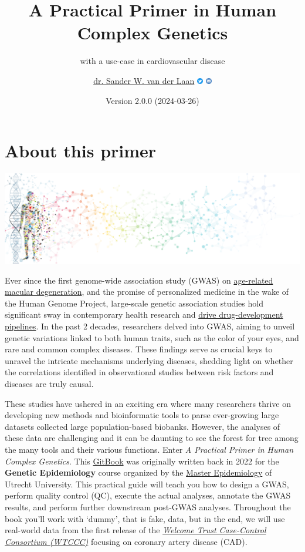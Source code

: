 \documentclass[
]{book}
\title{A Practical Primer in Human Complex Genetics}
\subtitle{with a use-case in cardiovascular disease}
\author{\href{https://vanderlaanand.science}{dr. Sander W. van der Laan} \href{https://www.twitter.com/swvanderlaan}{\includegraphics[width=0.02\textwidth,height=\textheight]{./img/_logo/twitter_circle_blue.png}} \href{mailto:s.w.vanderlaan@gmail.com}{\includegraphics[width=0.02\textwidth,height=\textheight]{./img/_logo/email_circle_blue.png}}}
\date{Version 2.0.0 (2024-03-26)}
\begin{document}
\maketitle

{
\setcounter{tocdepth}{1}
\tableofcontents
}
\hypertarget{about-this-primer}{%
\chapter{About this primer}\label{about-this-primer}}

\includegraphics[width=1\textwidth,height=\textheight]{./img/_headers/banner_man_standing_dna.png}

Ever since the first genome-wide association study (GWAS) on \href{https://doi.org/10.1126/science.1109557}{age-related macular degeneration}, and the promise of personalized medicine in the wake of the Human Genome Project, large-scale genetic association studies hold significant sway in contemporary health research and \href{http://dx.doi.org/10.1038/nrd.2017.262}{drive drug-development pipelines}. In the past 2 decades, researchers delved into GWAS, aiming to unveil genetic variations linked to both human traits, such as the color of your eyes, and rare and common complex diseases. These findings serve as crucial keys to unravel the intricate mechanisms underlying diseases, shedding light on whether the correlations identified in observational studies between risk factors and diseases are truly causal.

These studies have ushered in an exciting era where many researchers thrive on developing new methods and bioinformatic tools to parse ever-growing large datasets collected large population-based biobanks. However, the analyses of these data are challenging and it can be daunting to see the forest for tree among the many tools and their various functions. Enter \emph{A Practical Primer in Human Complex Genetics}. This \href{https://cjvanlissa.github.io/gitbook-demo/}{GitBook} was originally written back in 2022 for the \textbf{Genetic Epidemiology} course organized by the \href{https://epidemiology-education.nl}{Master Epidemiology} of Utrecht University. This practical guide will teach you how to design a GWAS, perform quality control (QC), execute the actual analyses, annotate the GWAS results, and perform further downstream post-GWAS analyses. Throughout the book you'll work with `dummy', that is fake, data, but in the end, we will use real-world data from the first release of the \href{https://www.wtccc.org.uk/ccc1/overview.html}{\emph{Welcome Trust Case-Control Consortium (WTCCC)}} focusing on coronary artery disease (CAD).
\end{document}
